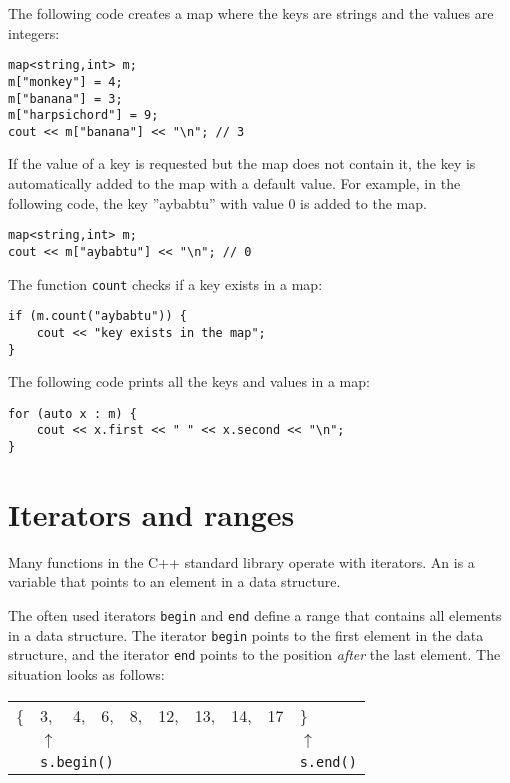 The following code creates a map
where the keys are strings and the values are integers:

\begin{lstlisting}
map<string,int> m;
m["monkey"] = 4;
m["banana"] = 3;
m["harpsichord"] = 9;
cout << m["banana"] << "\n"; // 3
\end{lstlisting}

If the value of a key is requested
but the map does not contain it,
the key is automatically added to the map with
a default value.
For example, in the following code,
the key ''aybabtu'' with value 0
is added to the map.

\begin{lstlisting}
map<string,int> m;
cout << m["aybabtu"] << "\n"; // 0
\end{lstlisting}
The function \texttt{count} checks
if a key exists in a map:
\begin{lstlisting}
if (m.count("aybabtu")) {
    cout << "key exists in the map";
}
\end{lstlisting}
The following code prints all the keys and values
in a map:
\begin{lstlisting}
for (auto x : m) {
    cout << x.first << " " << x.second << "\n";
}
\end{lstlisting}

\section{Iterators and ranges}


Many functions in the C++ standard library
operate with iterators.
An  is a variable that points
to an element in a data structure.

The often used iterators \texttt{begin}
and \texttt{end} define a range that contains
all elements in a data structure.
The iterator \texttt{begin} points to
the first element in the data structure,
and the iterator \texttt{end} points to
the position \emph{after} the last element.
The situation looks as follows:

\begin{center}
\begin{tabular}{llllllllll}
\{ & 3, & 4, & 6, & 8, & 12, & 13, & 14, & 17 & \} \\
& $\uparrow$ & & & & & & & & $\uparrow$ \\
& \multicolumn{3}{l}{\texttt{s.begin()}} & & & & & & \texttt{s.end()} \\
\end{tabular}
\end{center}

